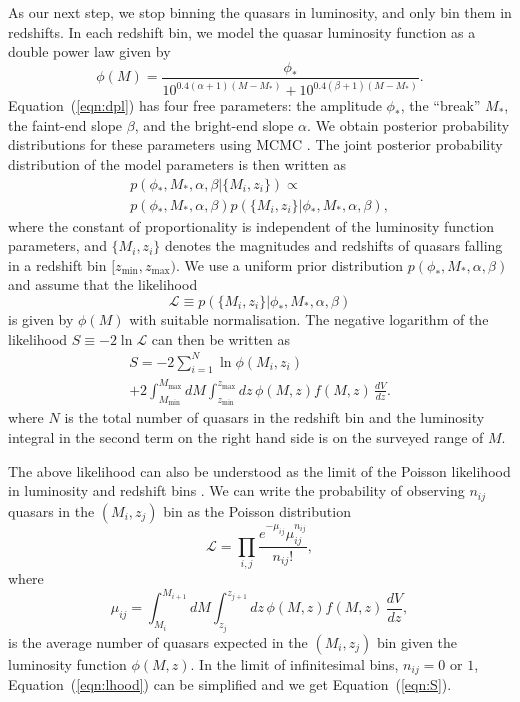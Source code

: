 \documentclass[a4paper,fleqn,usenatbib]{mnras}
\begin{document}
As our next step, we stop binning the quasars in luminosity, and only
bin them in redshifts.  In each redshift bin, we model the quasar
luminosity function as a double power law given by
\citep{1988MNRAS.235..935B, 1995ApJ...438..623P, 2000MNRAS.317.1014B}
\begin{equation}
  \phi(M) =
  \frac{\phi_*}{10^{0.4(\alpha+1)(M-M_*)}+10^{0.4(\beta+1)(M-M_*)}}.
  \label{eqn:dpl}
\end{equation}
Equation~(\ref{eqn:dpl}) has four free parameters: the amplitude
$\phi_*$, the ``break'' $M_*$, the faint-end slope $\beta$, and the
bright-end slope $\alpha$.  We obtain posterior probability
distributions for these parameters using MCMC \citep[e.g.,][]{jaynes}.
The joint posterior probability distribution of the model parameters
is then written as
\begin{multline}
  p(\phi_*, M_*, \alpha, \beta | \{M_i, z_i\}) \propto \\ p(\phi_*, M_*, \alpha, \beta)p(\{M_i, z_i\} | \phi_*, M_*, \alpha, \beta),
\end{multline}
where the constant of proportionality is independent of the luminosity
function parameters, and $\{M_i, z_i\}$ denotes the magnitudes and
redshifts of quasars falling in a redshift bin $[z_\mathrm{min},
  z_\mathrm{max})$.  We use a uniform prior distribution $p(\phi_*,
  M_*, \alpha, \beta)$ and assume that the likelihood
\begin{equation}
  \mathcal{L}\equiv p(\{M_i, z_i\} | \phi_*, M_*, \alpha, \beta)
\end{equation}
is given by $\phi(M)$ with suitable normalisation.  The negative
logarithm of the likelihood $S\equiv -2\ln\mathcal{L}$ can then be
written as
\begin{multline}
  S = -2\sum_{i=1}^N\ln\phi(M_i, z_i)\\+2\int_{M_\mathrm{min}}^{M_\mathrm{max}}dM\int_{z_\mathrm{min}}^{z_\mathrm{max}}dz\, \phi(M,z) f(M, z)\,\frac{dV}{dz}.
  \label{eqn:S}
\end{multline}
where $N$ is the total number of quasars in the redshift bin and the
luminosity integral in the second term on the right hand side is on
the surveyed range of $M$.

The above likelihood can also be understood as the limit of the
Poisson likelihood in luminosity and redshift bins
\citep{1983ApJ...269...35M, 2001AJ....121...54F}.  We can write the
probability of observing $n_{ij}$ quasars in the $(M_i, z_j)$ bin as
the Poisson distribution
\begin{equation}
  \mathcal{L}=\prod_{i,j}\frac{e^{-\mu_{ij}}\mu_{ij}^{n_{ij}}}{n_{ij}!},
  \label{eqn:lhood}
\end{equation}
where 
\begin{equation}
  \mu_{ij}= \int_{M_i}^{M_{i+1}}dM\int_{z_j}^{z_{j+1}}dz\, \phi(M,z) f(M, z)\,\frac{dV}{dz},
\end{equation}
is the average number of quasars expected in the $(M_i, z_j)$ bin
given the luminosity function $\phi(M,z)$.  In the limit of
infinitesimal bins, $n_{ij}=0$ or $1$, Equation~(\ref{eqn:lhood}) can
be simplified and we get Equation~(\ref{eqn:S}).
\end{document}
